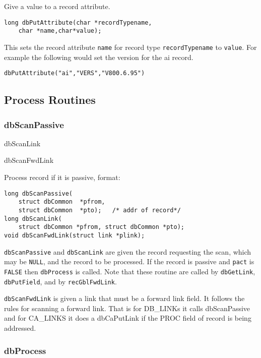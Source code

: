 Give a value to a record attribute.

\begin{verbatim}
long dbPutAttribute(char *recordTypename,
    char *name,char*value);
\end{verbatim}

This sets the record attribute \verb|name| for record type \verb|recordTypename| to \verb|value|. For example the following would set 
the version for the ai record.

\begin{verbatim}
dbPutAttribute("ai","VERS","V800.6.95")
\end{verbatim}

\subsection{Process Routines}

\subsubsection{dbScanPassive}

dbScanLink

dbScanFwdLink

Process record if it is passive, format:

\begin{verbatim}
long dbScanPassive(
    struct dbCommon  *pfrom,
    struct dbCommon  *pto);   /* addr of record*/
long dbScanLink(
    struct dbCommon *pfrom, struct dbCommon *pto);
void dbScanFwdLink(struct link *plink);
\end{verbatim}

 \verb|dbScanPassive| and \verb|dbScanLink| are given the record requesting the scan, which may be \verb|NULL|, and the record to 
be processed. If the record is passive and \verb|pact| is \verb|FALSE| then \verb|dbProcess| is called. Note that these routine are called by 
\verb|dbGetLink|, \verb|dbPutField|, and by \verb|recGblFwdLink|.

\verb|dbScanFwdLink| is given a link that must be a forward link field. It follows the rules for scanning a forward link. That 
is for DB\_LINKs it calls dbScanPassive and for CA\_LINKS it does a dbCaPutLink if the PROC field of record is being 
addressed.

\subsubsection{dbProcess }

